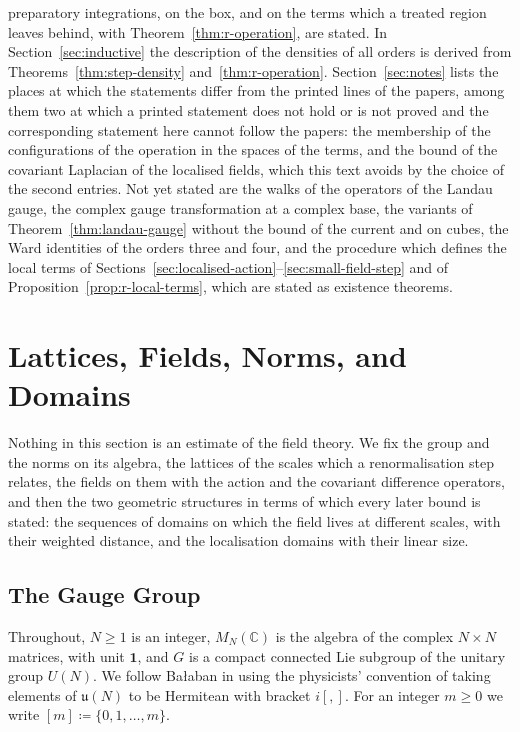 \documentclass[11pt]{preprint}
\makeatletter
\newcommand{\id}{\mathbf 1}
\newcommand*{\bigcdot}{}%
\DeclareRobustCommand*{\bigcdot}{%
	\mathbin{\mathpalette\bigcdot@{}}%
}
\newcommand*{\bigcdot@scalefactor}{.7}
\newcommand*{\bigcdot@widthfactor}{1.15}
\newcommand*{\bigcdot@}[2]{%
	\sbox0{$#1\vcenter{}$}%
	\sbox2{$#1\cdot\m@th$}%
	\hbox to \bigcdot@widthfactor\wd2{%
		\hss
		\raise\ht0\hbox{%
			\scalebox{\bigcdot@scalefactor}{%
				\lower\ht0\hbox{$#1\bullet\m@th$}%
			}%
		}%
		\hss
	}%
}
\numberwithin{equation}{section}
\makeatother
\begin{document}
preparatory integrations, on the box, and on the terms which a treated region leaves behind, with Theorem~\ref{thm:r-operation}, are stated. In Section~\ref{sec:inductive} the description of the densities of all orders is derived from Theorems~\ref{thm:step-density} and~\ref{thm:r-operation}. Section~\ref{sec:notes} lists the places at which the statements differ from the printed lines of the papers, among them two at which a printed statement does not hold or is not proved and the corresponding statement here cannot follow the papers: the membership of the configurations of the operation in the spaces of the terms, and the bound of the covariant Laplacian of the localised fields, which this text avoids by the choice of the second entries. Not yet stated are the walks of the operators of the Landau gauge, the complex gauge transformation at a complex base, the variants of Theorem~\ref{thm:landau-gauge} without the bound of the current and on cubes, the Ward identities of the orders three and four, and the procedure which defines the local terms of Sections~\ref{sec:localised-action}--\ref{sec:small-field-step} and of Proposition~\ref{prop:r-local-terms}, which are stated as existence theorems.

\section{Lattices, Fields, Norms, and Domains}\label{sec:setting}

Nothing in this section is an estimate of the field theory. We fix the group and the norms on its algebra, the lattices of the scales which a renormalisation step relates, the fields on them with the action and the covariant difference operators, and then the two geometric structures in terms of which every later bound is stated: the sequences of domains on which the field lives at different scales, with their weighted distance, and the localisation domains with their linear size.

\subsection{The Gauge Group}\label{sec:group}

Throughout, $N \geqslant 1$ is an integer, $M_N(\mathbb C)$ is the algebra of the complex $N \times N$ matrices, with unit $\id$, and $G$ is a compact connected Lie subgroup of the unitary group $U(N)$. We follow Ba{\l}aban in using the physicists' convention of taking elements of $\mathfrak{u}(N)$ to be Hermitean with bracket $i[\bigcdot, \bigcdot]$. For an integer $m \geqslant 0$ we write $[m] \coloneqq \{ 0, 1, \dots, m \}$.
\end{document}
